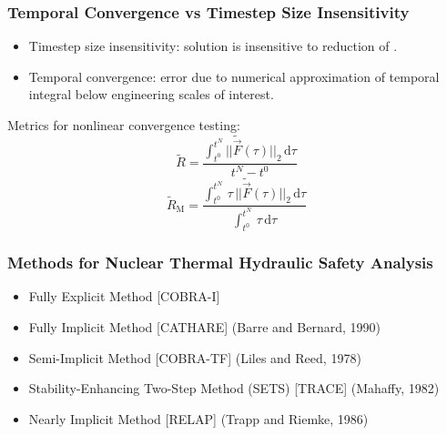 \documentclass[compress,xcolor=table]{beamer}
\begin{document}
%
\begin{frame}
\frametitle{Temporal Convergence vs Timestep Size Insensitivity}

\begin{itemize}
\item{Timestep size insensitivity: solution is insensitive to reduction of \dtmax{}.}
\item{Temporal convergence: error due to numerical approximation of temporal integral below engineering scales of interest.}
\end{itemize}

Metrics for nonlinear convergence testing:
\begin{equation*}
\tilde{R} = \frac{\int_{t^{0}}^{t^{N}} ||\tilde{\vec{F}}(\tau)||_2 \,\mathrm{d} \tau}{t^{N} - t^{0}}
\end{equation*}
\begin{equation*}
\tilde{R}_{\text{M}} = \frac{\int_{t^{0}}^{t^{N}} \,\tau\,||\tilde{\vec{F}}(\tau)||_2 \,\mathrm{d} \tau}{\int_{t^{0}}^{t^{N}} \,\tau \,\mathrm{d} \tau}
\end{equation*}

\end{frame}
\begin{frame}
\frametitle{Methods for Nuclear Thermal Hydraulic Safety Analysis}

\begin{itemize}
\item{Fully Explicit Method [COBRA-I]}
\item{Fully Implicit Method [CATHARE] (Barre and Bernard, 1990)}
\item{Semi-Implicit Method [COBRA-TF] (Liles and Reed, 1978) }
\item{Stability-Enhancing Two-Step Method (SETS) [TRACE] (Mahaffy, 1982) }
\item{Nearly Implicit Method [RELAP] (Trapp and Riemke, 1986) }
\end{itemize}

\end{frame}
\end{document}
